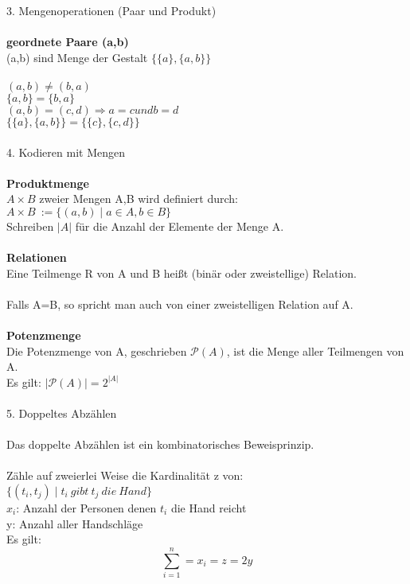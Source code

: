\documentclass{scrartcl}\usepackage[utf8]{inputenc}
\begin{document}
\Large 3. Mengenoperationen (Paar und Produkt)\\
\\
\normalsize
\textbf{geordnete Paare (a,b)}\\
(a,b) sind Menge der Gestalt $\{\{a\},\{a,b\}\}$\\
\\
$(a,b) \neq (b,a)$\\
$\{a,b\}=\{b,a\}$\\
$(a,b) = (c,d) \Rightarrow a=c und b=d$\\
$\{\{a\},\{a,b\}\}=\{\{c\},\{c,d\}\}$\\
\\
\Large 4. Kodieren mit Mengen\\
\\
\normalsize
\textbf{Produktmenge}\\
$A \times B$ zweier Mengen A,B wird definiert durch:\\
$A \times B\ := \{(a,b) \mid a \in A,b \in B\}$\\
Schreiben $\vert A\vert$ f\"ur die Anzahl der Elemente der Menge A. \\
\\
\textbf{Relationen}\\
Eine Teilmenge R von A und B hei\ss t (bin\"ar oder zweistellige) Relation.\\
\\
Falls A=B, so spricht man auch von einer zweistelligen Relation auf A.\\
\\
\textbf{Potenzmenge}\\
Die Potenzmenge von A, geschrieben $\mathcal{P}(A)$, ist die Menge aller Teilmengen von A.\\
Es gilt: $\vert \mathcal{P}(A) \vert = 2^{\vert A \vert}$\\
\\
\Large 5. Doppeltes Abz\"ahlen\\
\\
\normalsize
Das doppelte Abz\"ahlen ist ein kombinatorisches Beweisprinzip.\\
\\
Z\"ahle auf zweierlei Weise die Kardinalit\"at z von:\\
$\{(t_i , t_j) \mid t_i~gibt~ t_j~ die~ Hand\}$\\
$x_i$: Anzahl der Personen denen $t_i$ die Hand reicht\\
y: Anzahl aller Handschl\"age\\
Es gilt: \[ \sum_{i=1}^n = x_i=z=2y \]\\
\end{document}
